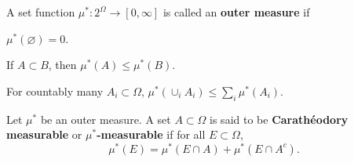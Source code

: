 \begin{definition}
    A set function $\mu^*: 2^\Omega\to[0,\infty]$ is called an \textbf{outer measure} if 
    \begin{thmenum}
        \item $\mu^*(\varnothing) = 0$. 
        \item If $A\subset B$, then $\mu^*(A)\leq \mu^*(B)$. 
        \item For countably many $A_i\subset\Omega$, $\mu^*(\cup_i A_i) \leq \sum_i \mu^*(A_i)$.
    \end{thmenum}
\end{definition}

\begin{definition}
    Let $\mu^*$ be an outer measure. A set $A\subset\Omega$ is said to be 
    \textbf{Carath\'eodory measurable} or \textbf{$\mu^*$-measurable} if for 
    all $E\subset\Omega$, 
    \begin{equation*}
        \mu^*(E) = \mu^*(E\cap A) + \mu^*(E\cap A^c).
    \end{equation*}
\end{definition}


